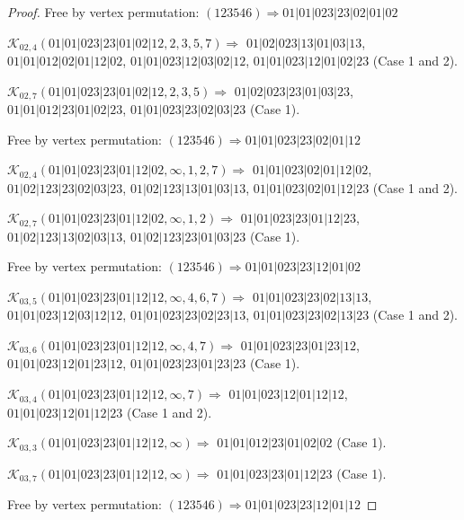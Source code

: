 \documentclass[12pt]{article}
\theoremstyle{plain}
\theoremstyle{definition}
\theoremstyle{remark}
\newcommand{\fancy}[1]{\mathcal{#1}}
\def\K{\fancy{K}}
\begin{document}
\begin{proof}
	Free by vertex permutation: $(1 2 3 5 4 6)\Rightarrow 01|01|023|23|02|01|02$
	
	
	
	\bigskip
	
	$\K_{02,4}(01|01|023|23|01|02|12,2, 3, 5, 7)\Rightarrow $ $01|02|023|13|01|03|13$, $01|01|012|02|01|12|02$, $01|01|023|12|03|02|12$, $01|01|023|12|01|02|23$ (Case 1 and 2).
	
	$\K_{02,7}(01|01|023|23|01|02|12,2, 3, 5)\Rightarrow $ $01|02|023|23|01|03|23$, $01|01|012|23|01|02|23$, $01|01|023|23|02|03|23$ (Case 1).
	
	
	
	Free by vertex permutation: $(1 2 3 5 4 6)\Rightarrow 01|01|023|23|02|01|12$
	
	
	
	\bigskip
	
	$\K_{02,4}(01|01|023|23|01|12|02,\infty,1, 2, 7)\Rightarrow $ $01|01|023|02|01|12|02$, $01|02|123|23|02|03|23$, $01|02|123|13|01|03|13$, $01|01|023|02|01|12|23$ (Case 1 and 2).
	
	$\K_{02,7}(01|01|023|23|01|12|02,\infty,1, 2)\Rightarrow $ $01|01|023|23|01|12|23$, $01|02|123|13|02|03|13$, $01|02|123|23|01|03|23$ (Case 1).
	
	
	
	Free by vertex permutation: $(1 2 3 5 4 6)\Rightarrow 01|01|023|23|12|01|02$
	
	
	
	\bigskip
	
	$\K_{03,5}(01|01|023|23|01|12|12,\infty,4, 6, 7)\Rightarrow $ $01|01|023|23|02|13|13$, $01|01|023|12|03|12|12$, $01|01|023|23|02|23|13$, $01|01|023|23|02|13|23$ (Case 1 and 2).
	
	$\K_{03,6}(01|01|023|23|01|12|12,\infty,4, 7)\Rightarrow $ $01|01|023|23|01|23|12$, $01|01|023|12|01|23|12$, $01|01|023|23|01|23|23$ (Case 1).
	
	$\K_{03,4}(01|01|023|23|01|12|12,\infty,7)\Rightarrow $ $01|01|023|12|01|12|12$, $01|01|023|12|01|12|23$ (Case 1 and 2).
	
	$\K_{03,3}(01|01|023|23|01|12|12,\infty)\Rightarrow $ $01|01|012|23|01|02|02$ (Case 1).
	
	$\K_{03,7}(01|01|023|23|01|12|12,\infty)\Rightarrow $ $01|01|023|23|01|12|23$ (Case 1).
	
	
	
	Free by vertex permutation: $(1 2 3 5 4 6)\Rightarrow 01|01|023|23|12|01|12$
	
	
	
	\bigskip
	

\end{proof}
\end{document}
